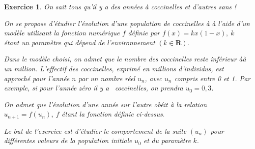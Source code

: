 \documentclass[12pt,a4paper,french]{article}
\newcommand{\R}{\mathbf{R}}
\theoremstyle{break}
\newtheorem{exercice}{Exercice}
\theoremstyle{nonumberplain}
\theoremstyle{nonumberbreak}
\begin{document}
\begin{exercice}
  On sait tous qu'il y a des années à coccinelles et d'autres sans !

  On se propose d'étudier l'évolution d'une population de coccinelles à
  à l'aide d'un modèle utilisant la fonction numérique $f$ définie par
  $f(x) = kx(1 - x),~ k$ étant un paramètre qui dépend de
  l'environnement $(k \in \R)$.

  Dans le modèle choisi, on admet que le nombre des coccinelles reste
  inférieur àà un million. L'effectif des coccinelles, exprimé en
  millions d'individus, est approché pour l'année $n$ par un nombre réel
  $u_{n}$, avec $u_{n}$ compris entre 0 et 1. Par exemple, si pour
  l'année zéro il y a ~coccinelles, on prendra $u_{0} =
  0,3$.

  On admet que l'évolution d'une année sur l'autre obéit à la relation
  $u_{n+1} = f\left(u_{n}\right),~ f$ étant la fonction définie
  ci-dessus.

  Le but de l'exercice est d'étudier le comportement de la suite
  $\left(u_{n}\right)$ pour différentes valeurs de la population
  initiale $u_{0}$ et du paramètre $k$.


\end{exercice}
\end{document}
